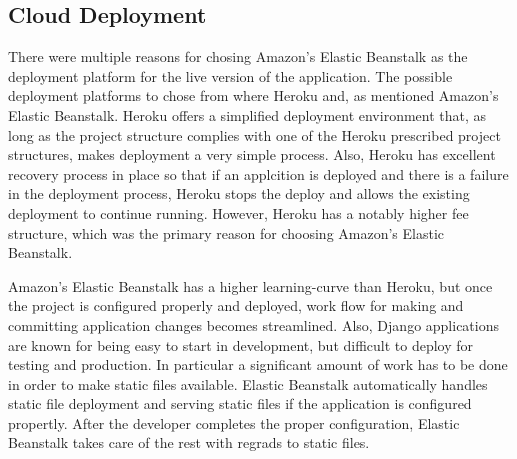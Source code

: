 \subsection{Cloud Deployment}
There were multiple reasons for chosing Amazon's Elastic Beanstalk as the 
deployment platform for the live version of the application.  The possible 
deployment platforms to chose from where Heroku\cite{Heroku2018} and, as 
mentioned Amazon's Elastic Beanstalk.  Heroku offers a simplified deployment 
environment that, as long as the project structure complies with one of the 
Heroku prescribed project structures, makes deployment a very simple process.  
Also, Heroku has excellent recovery process in place so that if an applcition 
is deployed and there is a failure in the deployment process, Heroku stops the 
deploy and allows the existing deployment to continue running.  However, 
Heroku has a notably higher fee structure, which was the primary reason for 
choosing Amazon's Elastic Beanstalk.  

Amazon's Elastic Beanstalk has a higher learning-curve than Heroku, but once 
the project is configured properly and deployed, work flow for making and 
committing application changes becomes streamlined.  Also, Django applications 
are known for being easy to start in development, but difficult to deploy for 
testing and production.  In particular a significant amount of work has to be 
done in order to make static files available.  Elastic Beanstalk automatically 
handles static file deployment and serving static files if the application is 
configured propertly.  After the developer completes the proper configuration, 
Elastic Beanstalk takes care of the rest with regrads to static files.

